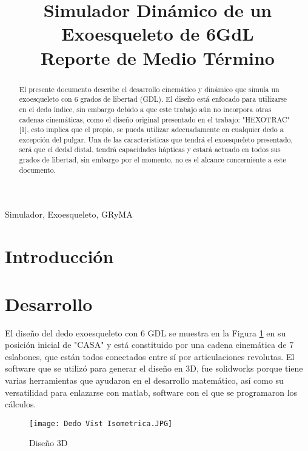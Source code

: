 \documentclass[journal]{IEEEtran}
\begin{document}
    \title{Simulador Dinámico de un Exoesqueleto de 6GdL\\
    \small{Reporte de Medio Término}}

    \author{
    }

    \maketitle

    \begin{abstract}
        El presente documento describe el desarrollo cinemático y dinámico que simula un exoesqueleto
        con 6 grados de libertad (GDL).
        \noindent El diseño está enfocado para utilizarse en el dedo índice, sin embargo debido a que
        este trabajo aún no incorpora otras cadenas cinemáticas, como el diseño original presentado en
        el trabajo: "HEXOTRAC"[1], esto implica que el propio, se pueda utilizar adecuadamente en
        cualquier dedo a excepción del pulgar. 
        \noindent Una de las características que tendrá el exoesqueleto presentado, será que el dedal
        distal, tendrá capacidades hápticas y estará actuado en todos sus grados de libertad,
        sin embargo por el momento, no es el alcance concerniente a este documento.         
    \end{abstract}

    \begin{IEEEkeywords}
    Simulador, Exoesqueleto, GRyMA
    \end{IEEEkeywords}

    \section{Introducción}

    \blindtext[0]

    \section{Desarrollo}

    \noindent El diseño del dedo exoesqueleto con 6 GDL se muestra en la Figura \ref{fig:3DModel} en su posición inicial de
    "CASA" y está constituido por una cadena cinemática de 7 eslabones, que están todos conectados entre sí por articulaciones
    revolutas. El software que se utilizó para generar el diseño en 3D, fue solidworks porque tiene varias herramientas que
    ayudaron en el desarrollo matemático, así como su versatilidad para enlazarse con matlab, software con el que se
    programaron los cálculos.  
    \begin{figure}[H]
        \centering
        \texttt{[image: Dedo Vist Isometrica.JPG]} 
        \caption{Diseño 3D}
        \label{fig:3DModel}
    \end{figure}
\end{document}
